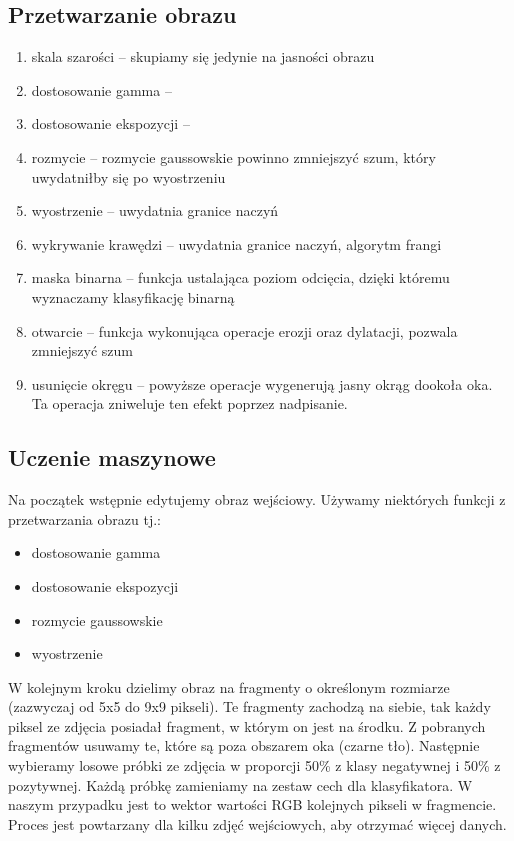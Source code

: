 \documentclass[polish,polish,a4paper]{article}
\begin{document}
		\subsection{Przetwarzanie obrazu}
			\begin{enumerate}
				\item skala szarości -- 
					skupiamy się jedynie na jasności obrazu
					
				\item dostosowanie gamma --
				
				\item dostosowanie ekspozycji --
				
				\item rozmycie --
					rozmycie gaussowskie  powinno zmniejszyć szum, który uwydatniłby się po wyostrzeniu
				
				\item wyostrzenie --
					uwydatnia granice naczyń
					
				\item wykrywanie krawędzi --
					uwydatnia granice naczyń, algorytm frangi
					
				\item maska binarna -- 
					funkcja ustalająca poziom odcięcia, 
					dzięki któremu wyznaczamy klasyfikację binarną
					
				\item otwarcie -- 
					funkcja wykonująca operacje erozji oraz dylatacji, 
					pozwala zmniejszyć szum
					
				\item usunięcie okręgu -- 
					powyższe operacje wygenerują jasny okrąg dookoła oka. Ta operacja zniweluje ten efekt poprzez nadpisanie.
			\end{enumerate}
		
		\subsection{Uczenie maszynowe}
			Na początek wstępnie edytujemy obraz wejściowy. Używamy niektórych funkcji z przetwarzania obrazu tj.:
			\begin{itemize}
				\item dostosowanie gamma
				\item dostosowanie ekspozycji
				\item rozmycie gaussowskie
				\item wyostrzenie
			\end{itemize}
			W kolejnym kroku dzielimy obraz na fragmenty o określonym rozmiarze (zazwyczaj od 5x5 do 9x9 pikseli).
			Te fragmenty zachodzą na siebie, tak każdy piksel ze zdjęcia posiadał fragment, w którym on jest na środku.
			Z pobranych fragmentów usuwamy te, które są poza obszarem oka (czarne tło).
			Następnie wybieramy losowe próbki ze zdjęcia w proporcji 50\% z klasy negatywnej i 50\% z pozytywnej.
			Każdą próbkę zamieniamy na zestaw cech dla klasyfikatora.
			W naszym przypadku jest to wektor wartości RGB kolejnych pikseli w fragmencie. 
			Proces jest powtarzany dla kilku zdjęć wejściowych, aby otrzymać więcej danych.
			
\end{document}
